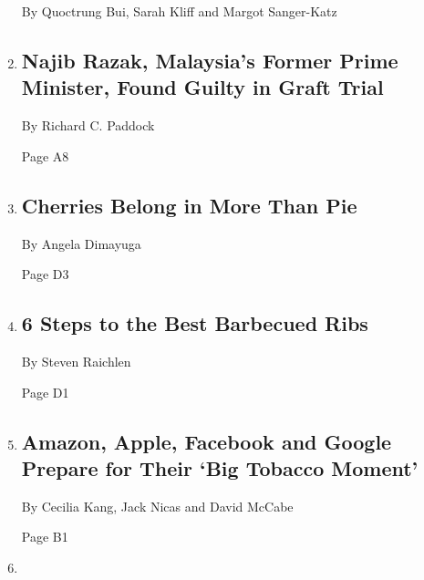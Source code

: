 \begin{enumerate}
  By Quoctrung Bui, Sarah Kliff and Margot Sanger-Katz
\item
  \href{/2020/07/28/world/asia/malaysia-1mdb-najib.html}{}

  \hypertarget{najib-razak-malaysias-former-prime-minister-found-guilty-in-graft-trial}{%
  \subsection{Najib Razak, Malaysia's Former Prime Minister, Found
  Guilty in Graft
  Trial}\label{najib-razak-malaysias-former-prime-minister-found-guilty-in-graft-trial}}

  By Richard C. Paddock

  Page A8
\item
  \href{/2020/07/24/dining/cherry-salad-recipe.html}{}

  \hypertarget{cherries-belong-in-more-than-pie}{%
  \subsection{Cherries Belong in More Than
  Pie}\label{cherries-belong-in-more-than-pie}}

  By Angela Dimayuga

  Page D3
\item
  \href{/2020/07/24/dining/bbq-ribs-recipe.html}{}

  \hypertarget{6-steps-to-the-best-barbecued-ribs}{%
  \subsection{6 Steps to the Best Barbecued
  Ribs}\label{6-steps-to-the-best-barbecued-ribs}}

  By Steven Raichlen

  Page D1
\item
  \href{/2020/07/28/technology/amazon-apple-facebook-google-antitrust-hearing.html}{}

  \hypertarget{amazon-apple-facebook-and-google-prepare-for-their-big-tobacco-moment}{%
  \subsection{Amazon, Apple, Facebook and Google Prepare for Their `Big
  Tobacco
  Moment'}\label{amazon-apple-facebook-and-google-prepare-for-their-big-tobacco-moment}}

  By Cecilia Kang, Jack Nicas and David McCabe

  Page B1
\item
  \href{/2020/07/28/sports/baseball/marlins-outbreak-mlb-coronavirus.html}{}


\end{enumerate}
